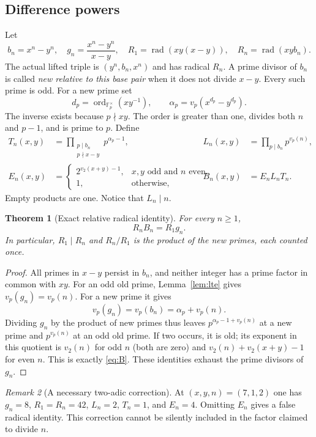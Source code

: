 \documentclass[11pt]{article}
\newtheorem{theorem}{Theorem}[section]
\theoremstyle{definition}\newtheorem{definition}[theorem]{Definition}
\theoremstyle{remark}\newtheorem{remark}[theorem]{Remark}
\DeclareMathOperator{\rad}{rad}\DeclareMathOperator{\ord}{ord}\DeclareMathOperator{\lcm}{lcm}
\begin{document}
\subsection{Difference powers}
Let
\[
b_n=x^n-y^n,\quad g_n=\frac{x^n-y^n}{x-y},\quad
R_1=\rad(xy(x-y)),\quad R_n=\rad(xy b_n).
\]
The actual lifted triple is $(y^n,b_n,x^n)$ and has radical $R_n$.
A prime divisor of $b_n$ is called \emph{new relative to this base pair}
when it does not divide $x-y$. Every such prime is odd. For a new prime set
\[
d_p=\ord_{\mathbb F_p^\times}(xy^{-1}),\qquad
\alpha_p=v_p(x^{d_p}-y^{d_p}).
\]
The inverse exists because $p\nmid xy$. The order is greater than one,
divides both $n$ and $p-1$, and is prime to $p$. Define
\begin{align}
T_n(x,y)&=\prod_{\substack{p\mid b_n\\p\nmid x-y}}p^{\alpha_p-1},
&L_n(x,y)&=\prod_{p\mid b_n}p^{v_p(n)},\label{eq:TL}\\
E_n(x,y)&=
\begin{cases}
2^{v_2(x+y)-1},&x,y\text{ odd and }n\text{ even},\\
1,&\text{otherwise},
\end{cases}
&B_n(x,y)&=E_nL_nT_n.\label{eq:B}
\end{align}
Empty products are one. Notice that $L_n\mid n$.

\begin{theorem}[Exact relative radical identity]\label{thm:balance}
For every $n\ge1$,
\begin{equation}\label{eq:balance}
R_n B_n=R_1 g_n.
\end{equation}
In particular, $R_1\mid R_n$ and $R_n/R_1$ is the product of the new primes,
each counted once.
\end{theorem}
\begin{proof}
All primes in $x-y$ persist in $b_n$, and neither integer has a prime factor
in common with $xy$. For an odd old prime, Lemma~\ref{lem:lte} gives
$v_p(g_n)=v_p(n)$. For a new prime it gives
\[
v_p(g_n)=v_p(b_n)=\alpha_p+v_p(n).
\]
Dividing $g_n$ by the product of new primes thus leaves
$p^{\alpha_p-1+v_p(n)}$ at a new prime and $p^{v_p(n)}$ at an odd old prime.
If two occurs, it is old; its exponent in this quotient is $v_2(n)$ for odd
$n$ (both are zero) and $v_2(n)+v_2(x+y)-1$ for even $n$. This is exactly
\eqref{eq:B}. These identities exhaust the prime divisors of $g_n$.
\end{proof}

\begin{remark}[A necessary two-adic correction]
At $(x,y,n)=(7,1,2)$ one has $g_n=8$, $R_1=R_n=42$, $L_n=2$, $T_n=1$,
and $E_n=4$. Omitting $E_n$ gives a false radical identity. This correction
cannot be silently included in the factor claimed to divide $n$.
\end{remark}
\end{document}
